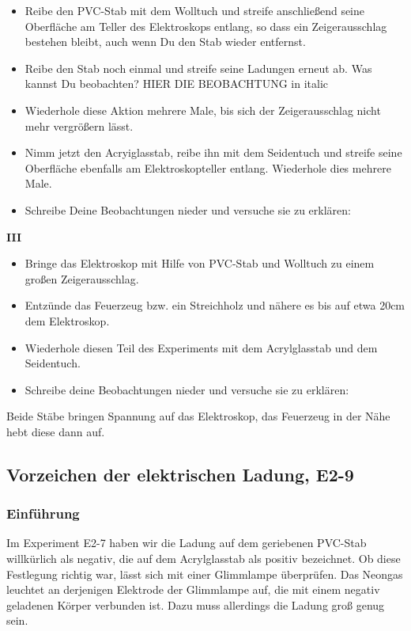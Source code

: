\documentclass{report}
\begin{document}
\begin{itemize} \item Reibe den PVC-Stab mit dem Wolltuch und streife
  anschließend seine Oberfläche am Teller des Elektroskops entlang, so dass ein
  Zeigerausschlag bestehen bleibt, auch wenn Du den Stab wieder entfernst.
  \item Reibe den Stab noch einmal und streife seine Ladungen erneut ab. Was
    kannst Du beobachten? HIER DIE BEOBACHTUNG in italic \item Wiederhole diese
    Aktion mehrere Male, bis sich der Zeigerausschlag nicht mehr vergrößern
    lässt. \item Nimm jetzt den Acryiglasstab, reibe ihn mit dem Seidentuch und
    streife seine Oberfläche ebenfalls am Elektroskopteller entlang. Wiederhole
    dies mehrere Male. \item Schreibe Deine Beobachtungen nieder und versuche
    sie zu erklären: \end{itemize}

    \textbf{III}\\ \begin{itemize} \item Bringe das Elektroskop mit Hilfe von
      PVC-Stab und Wolltuch zu einem großen Zeigerausschlag. \item Entzünde das
      Feuerzeug bzw. ein Streichholz und nähere es bis auf etwa 20cm dem
      Elektroskop. \item Wiederhole diesen Teil des Experiments mit dem
      Acrylglasstab und dem Seidentuch. \item Schreibe deine Beobachtungen
  nieder und versuche sie zu erklären: \end{itemize}
Beide Stäbe bringen Spannung auf das Elektroskop, das Feuerzeug in der Nähe
hebt diese dann auf.


\subsection{Vorzeichen der elektrischen Ladung, E2-9}

\subsubsection{Einführung} Im Experiment E2-7 haben wir die Ladung auf dem
geriebenen PVC-Stab willkürlich als negativ, die auf dem Acrylglasstab als
positiv bezeichnet. Ob diese Festlegung richtig war, lässt sich mit einer
Glimmlampe überprüfen. Das Neongas leuchtet an derjenigen Elektrode der
Glimmlampe auf, die mit einem negativ geladenen Körper verbunden ist. Dazu muss
allerdings die Ladung groß genug sein.
\end{document}
